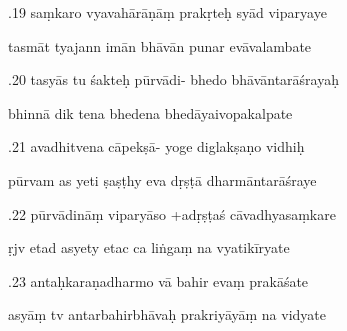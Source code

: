 \documentclass[article,12pt,a4paper]{memoir}%
\newcounter{parCount}
\begin{document}
	  
	  \pstart {}.19 saṃkaro vyavahārāṇāṃ prakṛteḥ syād viparyaye 
	{}
	\pend%
      

	  
	  \pstart \leavevmode%
	tasmāt tyajann imān bhāvān punar evāvalambate 
	{}
	\pend%
      

	  
	  \pstart {}.20 tasyās tu śakteḥ pūrvādi- bhedo bhāvāntarāśrayaḥ 
	{}
	\pend%
      

	  
	  \pstart \leavevmode%
	bhinnā dik tena bhedena bhedāyaivopakalpate 
	{}
	\pend%
      

	  
	  \pstart {}.21 avadhitvena cāpekṣā- yoge diglakṣaṇo vidhiḥ 
	{}
	\pend%
      

	  
	  \pstart \leavevmode%
	pūrvam as yeti ṣaṣṭhy eva dṛṣṭā dharmāntarāśraye 
	{}
	\pend%
      

	  
	  \pstart {}.22 pūrvādināṃ viparyāso +adṛṣṭaś cāvadhyasaṃkare 
	{}
	\pend%
      

	  
	  \pstart \leavevmode%
	ṛjv etad asyety etac ca liṅgaṃ na vyatikīryate 
	{}
	\pend%
      

	  
	  \pstart {}.23 antaḥkaraṇadharmo vā bahir evaṃ prakāśate 
	{}
	\pend%
      

	  
	  \pstart \leavevmode%
	asyāṃ tv antarbahirbhāvaḥ prakriyāyāṃ na vidyate 
	{}
	\pend%
      
\end{document}
